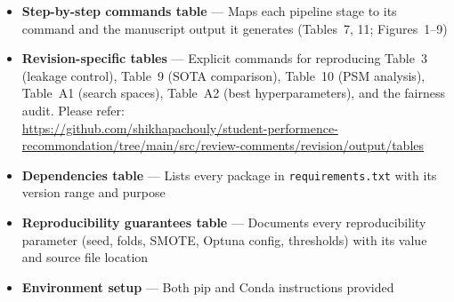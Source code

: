 \documentclass[11pt,a4paper]{article}
\newcommand{\filebox}[1]{\texttt{\small #1}}
\newcommand{\stress}[1]{\textbf{#1}}
\begin{document}
\begin{itemize}
  \item \stress{Step-by-step commands table} — Maps each pipeline stage to its command and the manuscript output it generates (Tables~7, 11; Figures~1--9)
  \item \stress{Revision-specific tables} — Explicit commands for reproducing Table~3 (leakage control), Table~9 (SOTA comparison), Table~10 (PSM analysis), Table~A1 (search spaces), Table~A2 (best hyperparameters), and the fairness audit. Please refer: \\ \url{https://github.com/shikhapachouly/student-performence-recommondation/tree/main/src/review-comments/revision/output/tables}
  \item \stress{Dependencies table} — Lists every package in \filebox{requirements.txt} with its version range and purpose
  \item \stress{Reproducibility guarantees table} — Documents every reproducibility parameter (seed, folds, SMOTE, Optuna config, thresholds) with its value and source file location
  \item \stress{Environment setup} — Both pip and Conda instructions provided
\end{itemize}
\end{document}
